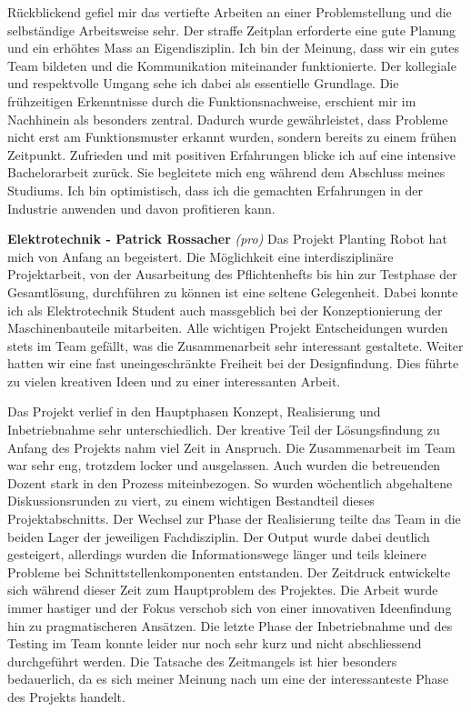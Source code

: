 Rückblickend gefiel mir das vertiefte Arbeiten an einer Problemstellung und die selbständige Arbeitsweise sehr. Der straffe Zeitplan erforderte eine gute Planung und ein erhöhtes Mass an Eigendisziplin. Ich bin der Meinung, dass wir ein gutes Team bildeten und die Kommunikation miteinander funktionierte. Der kollegiale und respektvolle Umgang sehe ich dabei als essentielle Grundlage. Die frühzeitigen Erkenntnisse durch die Funktionsnachweise, erschient mir im Nachhinein als besonders zentral. Dadurch wurde gewährleistet, dass Probleme nicht erst am Funktionsmuster erkannt wurden, sondern bereits zu einem frühen Zeitpunkt.
\newline
Zufrieden und mit positiven Erfahrungen blicke ich auf eine intensive Bachelorarbeit zurück. Sie begleitete mich eng während dem Abschluss meines Studiums. Ich bin optimistisch, dass ich die gemachten Erfahrungen in der Industrie anwenden und davon profitieren kann.
\newline

\textbf{Elektrotechnik - Patrick Rossacher}
\newline
\textit{(pro)} Das Projekt Planting Robot hat mich von Anfang an begeistert. Die Möglichkeit eine interdisziplinäre Projektarbeit, von der Ausarbeitung des Pflichtenhefts bis hin zur Testphase der Gesamtlösung, durchführen zu können ist eine seltene Gelegenheit. Dabei konnte ich als Elektrotechnik Student auch massgeblich bei der Konzeptionierung der Maschinenbauteile mitarbeiten. Alle wichtigen Projekt Entscheidungen wurden stets im Team gefällt, was die Zusammenarbeit sehr interessant gestaltete. Weiter hatten wir eine fast uneingeschränkte Freiheit bei der Designfindung. Dies führte zu vielen kreativen Ideen und zu einer interessanten Arbeit.
\newline
	
Das Projekt verlief in den Hauptphasen Konzept, Realisierung und Inbetriebnahme sehr unterschiedlich. Der kreative Teil der Lösungsfindung zu Anfang des Projekts nahm viel Zeit in Anspruch. Die Zusammenarbeit im Team war sehr eng, trotzdem locker und ausgelassen. Auch wurden die betreuenden Dozent stark in den Prozess miteinbezogen. So wurden wöchentlich abgehaltene Diskussionsrunden zu viert, zu einem wichtigen Bestandteil dieses Projektabschnitts. Der Wechsel zur Phase der Realisierung teilte das Team in die beiden Lager der jeweiligen Fachdisziplin. Der Output wurde dabei deutlich gesteigert, allerdings wurden die Informationswege länger und teils kleinere Probleme bei Schnittstellenkomponenten entstanden. Der Zeitdruck entwickelte sich während dieser Zeit zum Hauptproblem des Projektes. Die Arbeit wurde immer hastiger und der Fokus verschob sich von einer innovativen Ideenfindung hin zu pragmatischeren Ansätzen. Die letzte Phase der Inbetriebnahme und des Testing im Team konnte leider nur noch sehr kurz und nicht abschliessend durchgeführt werden. Die Tatsache des Zeitmangels ist hier besonders bedauerlich, da es sich meiner Meinung nach um eine der interessanteste Phase des Projekts handelt.
\newline

